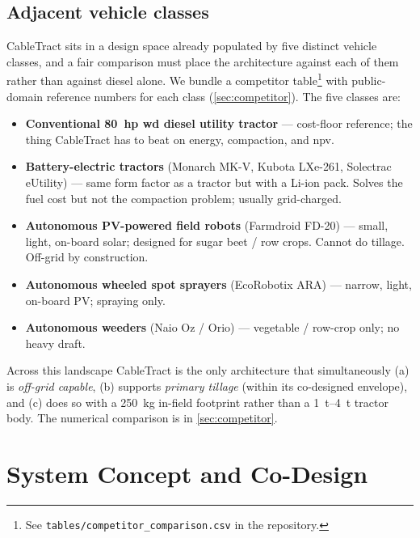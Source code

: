 \documentclass[11pt,a4paper]{article}
\begin{document}
\subsection{Adjacent vehicle classes}\label{sec:related-adjacent}

CableTract sits in a design space already populated by five distinct vehicle classes, and a fair comparison must place the architecture against each of them rather than against diesel alone. We bundle a competitor table\footnote{See \texttt{tables/competitor\_comparison.csv} in the repository.} with public-domain reference numbers for each class (\cref{sec:competitor}). The five classes are:

\begin{itemize}[leftmargin=1.6em,itemsep=0.15em]
    \item \textbf{Conventional \SI{80}{hp} \gls{wd} diesel utility tractor} --- cost-floor reference; the thing CableTract has to beat on energy, compaction, and \gls{npv}.
    \item \textbf{Battery-electric tractors} (Monarch MK-V, Kubota LXe-261, Solectrac eUtility) --- same form factor as a tractor but with a Li-ion pack. Solves the fuel cost but not the compaction problem; usually grid-charged.
    \item \textbf{Autonomous PV-powered field robots} (Farmdroid FD-20) --- small, light, on-board solar; designed for sugar beet / row crops. Cannot do tillage. Off-grid by construction.
    \item \textbf{Autonomous wheeled spot sprayers} (EcoRobotix ARA) --- narrow, light, on-board PV; spraying only.
    \item \textbf{Autonomous weeders} (Naio Oz / Orio) --- vegetable / row-crop only; no heavy draft.
\end{itemize}

Across this landscape CableTract is the only architecture that simultaneously (a) is \emph{off-grid capable}, (b) supports \emph{primary tillage} (within its co-designed envelope), and (c) does so with a \SI{250}{\kilogram} in-field footprint rather than a \SIrange{1}{4}{\tonne} tractor body. The numerical comparison is in \cref{sec:competitor}.

\section{System Concept and Co-Design}\label{sec:concept}
\end{document}
